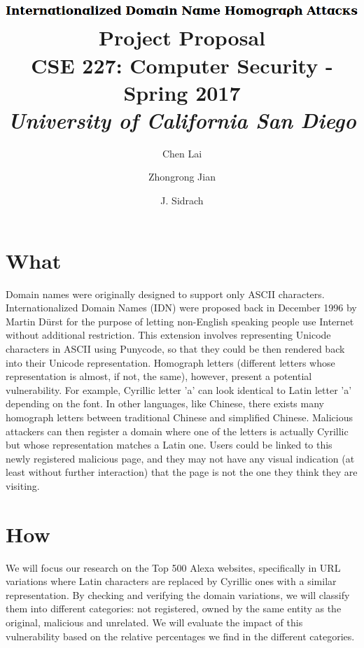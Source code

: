 \documentclass[letterpaper,twocolumn,10pt]{article}
\begin{document}
\date{}

\title{\Large \textbf{
\includegraphics[height=\baselineskip]{title} \\
Project Proposal } \\ \vspace{0.025 in} \large \normalfont
CSE 227: Computer Security - Spring 2017 \\ \textit{
University of California San Diego
}}

\author{
{\rm Chen Lai}\\
\and
{\rm Zhongrong Jian}\\
\and
{\rm J. Sidrach}\\
}

\maketitle

\section{What}

Domain names were originally designed to support only ASCII characters.
Internationalized Domain Names (IDN) were proposed back in December 1996 by Martin Dürst for the purpose of letting non-English speaking people use Internet without  additional restriction.
This extension involves representing Unicode characters in ASCII using Punycode, so that they could be then rendered back into their Unicode representation.
Homograph letters (different letters whose representation is almost, if not, the same), however, present a potential vulnerability.
For example, Cyrillic letter 'a' can look identical to Latin letter 'a' depending on the font.
In other languages, like Chinese, there exists many homograph letters between traditional Chinese and simplified Chinese.
Malicious attackers can then register a domain where one of the letters is actually Cyrillic but whose representation matches a Latin one.
Users could be linked to this newly registered malicious page, and they may not have any visual indication (at least without further interaction) that the page is not the one they think they are visiting.

\section{How}
We will focus our research on the Top 500 Alexa websites, specifically in URL variations where Latin characters are replaced by Cyrillic ones with a similar representation.
By checking and verifying the domain variations, we will classify them into different categories: not registered, owned by the same entity as the original, malicious and unrelated.
We will evaluate the impact of this vulnerability based on the relative percentages we find in the different categories.
\end{document}

